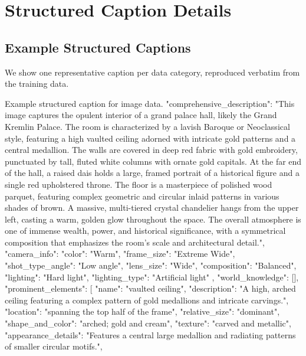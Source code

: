 \clearpage
\appendix
\section{Structured Caption Details}
\label{app:caption}



\subsection{Example Structured Captions}
\label{app:caption:examples}

We show one representative caption per data category, reproduced verbatim
from the training data.


\begin{captionexample}{Example structured caption for image data.}
{
  "comprehensive_description": "This image captures the opulent interior of a grand palace hall, likely the Grand Kremlin Palace. The room is characterized by a lavish Baroque or Neoclassical style, featuring a high vaulted ceiling adorned with intricate gold patterns and a central medallion. The walls are covered in deep red fabric with gold embroidery, punctuated by tall, fluted white columns with ornate gold capitals. At the far end of the hall, a raised dais holds a large, framed portrait of a historical figure and a single red upholstered throne. The floor is a masterpiece of polished wood parquet, featuring complex geometric and circular inlaid patterns in various shades of brown. A massive, multi-tiered crystal chandelier hangs from the upper left, casting a warm, golden glow throughout the space. The overall atmosphere is one of immense wealth, power, and historical significance, with a symmetrical composition that emphasizes the room's scale and architectural detail.",
  "camera_info": {
    "color": "Warm",
    "frame_size": "Extreme Wide",
    "shot_type_angle": "Low angle",
    "lens_size": "Wide",
    "composition": "Balanced",
    "lighting": "Hard light",
    "lighting_type": "Artificial light"
  },
  "world_knowledge": [],
  "prominent_elements": [
    {
      "name": "vaulted ceiling",
      "description": "A high, arched ceiling featuring a complex pattern of gold medallions and intricate carvings.",
      "location": "spanning the top half of the frame",
      "relative_size": "dominant",
      "shape_and_color": "arched; gold and cream",
      "texture": "carved and metallic",
      "appearance_details": "Features a central large medallion and radiating patterns of smaller circular motifs.",
}}
\end{captionexample}
